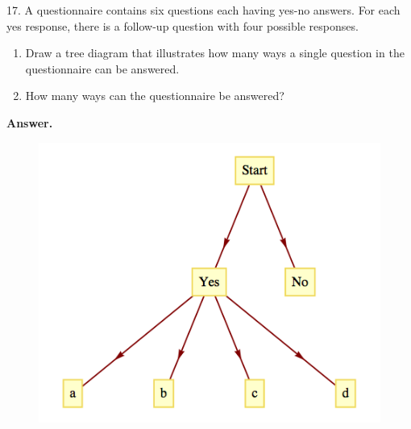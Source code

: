 \documentclass[10pt,]{book}
\theoremstyle{plain}
\theoremstyle{definition}
\theoremstyle{definition}
\theoremstyle{definition}
\begin{document}
\begin{exercisegroup}
\item[17.]\hypertarget{exercise-17}{} A questionnaire contains six questions each having yes-no answers. For each yes response, there is a follow-up question with four possible responses.%
\par
\leavevmode%
\begin{enumerate}[label=\alph*]
\item\hypertarget{li-10}{}Draw a tree diagram that illustrates how many ways a single question in the questionnaire can be answered.%
\item\hypertarget{li-11}{}How many ways can the questionnaire be answered?%
\end{enumerate}
%
\par\smallskip
\par\smallskip
\noindent\textbf{Answer.}\hypertarget{answer-9}{}\quad
\leavevmode%
\begin{figure}
\centering
\includegraphics[width=1\linewidth]{images/fig-sol-2-1-17.png}
\end{figure}


\end{exercisegroup}
\end{document}
